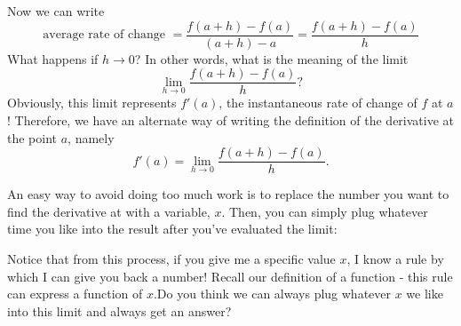 \documentclass{ximera}
\begin{document}
Now we can write
\[
{\text{average rate of change  }}=\frac{f(a+h)-f(a)}{(a+h)-a}=\frac{f(a+h)-f(a)}{h}
  \]
  What happens if $h\to0$? In other words, what is the meaning of the limit
\[
 \lim_{h\to 0} \frac{f(a+h)-f(a)}{h}?
\]
Obviously, this limit represents $f'(a)$, the instantaneous rate of change of $f$ at $a$! Therefore, 
we have 
an alternate way of writing the definition of the derivative at the point $a$, namely
\[
f'(a) = \lim_{h\to 0} \frac{f(a+h)-f(a)}{h}.
\]

An easy way to avoid doing too much work is to replace the number you want to find the derivative at with a variable, $x$. Then, you can simply plug whatever time you like into the result after you've evaluated the limit:

  \begin{image}
  \end{image}

Notice that from this process, if you give me a specific value $x$, I know a rule by which I can give you back a number! Recall our definition of a function - this rule can express a function of $x$.Do you think we can always plug whatever $x$ we like into this limit and always get an answer?
\end{document}
